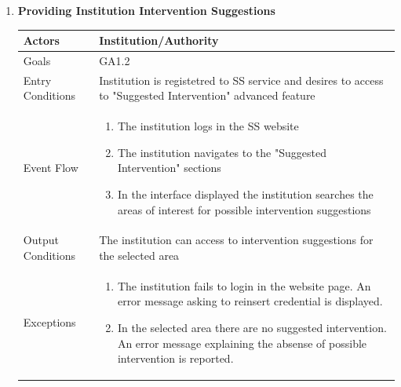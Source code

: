 \begin{enumerate}
	\item \textbf{Providing Institution Intervention Suggestions}
		\begin{table}[h!]
		\begin{tabular}{|l|p{}|}
		\hline
		Actors            			&       	Institution/Authority\\ \hline
		Goals             			&         	GA1.2\\ \hline
		Entry Conditions  	&  		Institution is registetred to SS service and desires to access to "Suggested Intervention" advanced feature\\ \hline
		Event Flow        		&          
				\begin{enumerate}[label=\alph*)]
					\item The institution logs in the SS website
					\item The institution navigates to the "Suggested Intervention" sections
					\item In the interface displayed the institution searches the areas of interest for possible intervention suggestions
					\end{enumerate}\\ \hline
		Output Conditions &    		The institution can access to intervention suggestions for the selected area\\ \hline
		Exceptions        		&       	
				\begin{enumerate}[label=\alph*)]
					\item The institution fails to login in the website page. An error message asking to reinsert credential is displayed.
					\item In the selected area there are no suggested intervention. An error message explaining the absense of possible intervention is reported.
				\end{enumerate}\\ \hline
	\end{tabular}
	\end{table}
	

\end{enumerate}
